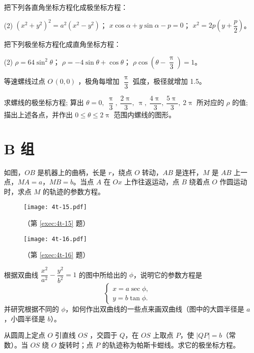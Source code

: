 \begin{question}
\begin{tasks}
  \end{tasks}
  \item 把下列各直角坐标方程化成极坐标方程：
  \begin{tasks}(2)
    \task $\left(x^2+y^2\right)^2=a^2\left(x^2-y^2\right)$；
    \task $x\cos\alpha+y\sin\alpha-p=0$；
    \task $x^2=2p\left(y+\dfrac{p}{2}\right)$。
  \end{tasks}
  \item 把下列极坐标方程化成直角坐标方程：
  \begin{tasks}(2)
    \task $\rho=64\sin^2\theta$；
    \task $\rho=-4\sin\theta+\cos\theta$；
    \task $\rho\cos\left(\theta-\dfrac{\uppi}{3}\right)=1$。
  \end{tasks}
  \item 等速螺线过点 $O\,(0,0)$ ，极角每增加 $\dfrac{\uppi}{3}$ 弧度，极径就增加 1.5。
  \begin{tasks}
    \task 求螺线的极坐标方程;
    \task 算出 $\theta=0,\ \dfrac{\uppi}{3},\ \dfrac{2\uppi}{3},\ \uppi,\ \dfrac{4\uppi}{3},\ \dfrac{5\uppi}{3},\ 2\uppi$ 所对应的 $\rho$ 的值;
    \task 描出上述各点，并作出 $0\leqslant \theta \leqslant 2\uppi$ 范围内螺线的图形。
  \end{tasks}
\end{question}
\section*{B 组}
\begin{question}[resume]
  \item \label{exec:4t-15} 如图，$OB$ 是机器上的曲柄，长是 $r$，绕点 $O$ 转动，$AB$ 是连杆，$M$ 是 $AB$ 上一点，$MA=a$，$MB=b$。当点 $A$ 在 $Ox$ 上作往返运动，点 $B$ 绕着点 $O$ 作圆运动时，求点 $M$ 的轨迹的参数方程。
  \begin{figure}
    \begin{minipage}{0.48\linewidth}\centering
      \texttt{[image: 4t-15.pdf]}
      \caption*{（第 \ref{exec:4t-15} 题）}
    \end{minipage}
    \begin{minipage}{0.48\linewidth}\centering
      \texttt{[image: 4t-16.pdf]}
      \caption*{（第 \ref{exec:4t-16} 题）}
    \end{minipage}
  \end{figure}
  \item \label{exec:4t-16}根据双曲线 $\dfrac{x^2}{a^2}-\dfrac{y^2}{b^2}=1$ 的图中所给出的 $\phi$，说明它的参数方程是
  \[\begin{cases} x=a\sec\phi,\\ y=b\tan\phi.\end{cases} \]
  并研究根据不同的 $\phi$，如何作出双曲线的一些点来画双曲线（图中的大圆半径是 $a$，小圆半径是 $b$）。
  \item 从圆周上定点 $O$ 引直线 $OS$ ，交圆于 $Q$，在 $OS$ 上取点 $P$，使 $| QP|=b$（常数）。当 $OS$ 绕 $O$ 旋转时；点 $P$ 的轨迹称为帕斯卡蚶线。求它的极坐标方程。
\end{question}

